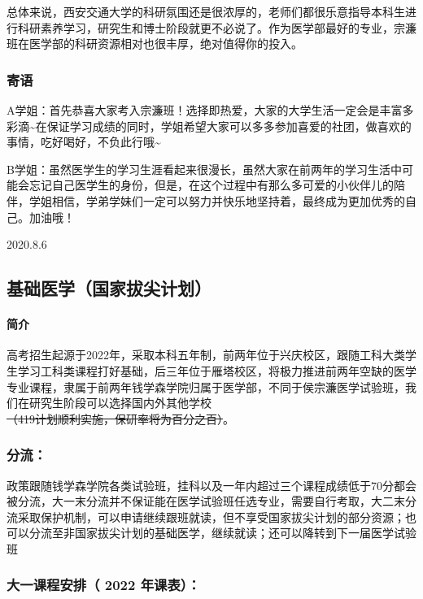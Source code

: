 \documentclass[
decoration,  %
]{qyxf-book}
\begin{document}
总体来说，西安交通大学的科研氛围还是很浓厚的，老师们都很乐意指导本科生进行科研素养学习，研究生和博士阶段就更不必说了。作为医学部最好的专业，宗濂班在医学部的科研资源相对也很丰厚，绝对值得你的投入。

\hypertarget{ux5bc4ux8bed-1}{%
	\subsubsection{寄语}\label{ux5bc4ux8bed-1}}

A学姐：首先恭喜大家考入宗濂班！选择即热爱，大家的大学生活一定会是丰富多彩滴\textasciitilde{}在保证学习成绩的同时，学姐希望大家可以多多参加喜爱的社团，做喜欢的事情，吃好喝好，不负此行哦\textasciitilde{}

B学姐：虽然医学生的学习生涯看起来很漫长，虽然大家在前两年的学习生活中可能会忘记自己医学生的身份，但是，在这个过程中有那么多可爱的小伙伴儿的陪伴，学姐相信，学弟学妹们一定可以努力并快乐地坚持着，最终成为更加优秀的自己。加油哦！

2020.8.6

\subsection{基础医学（国家拔尖计划）}

\paragraph{简介}

高考招生起源于2022年，采取本科五年制，前两年位于兴庆校区，跟随工科大类学生学习工科类课程打好基础，后三年位于雁塔校区，将极力推进前两年空缺的医学专业课程，隶属于前两年钱学森学院归属于医学部，不同于侯宗濂医学试验班，我们在研究生阶段可以选择国内外其他学校\\
\sout{（419计划顺利实施，保研率将为百分之百）}。

\subsubsection{分流：}

政策跟随钱学森学院各类试验班，挂科以及一年内超过三个课程成绩低于70分都会被分流，大一末分流并不保证能在医学试验班任选专业，需要自行考取，大二末分流采取保护机制，可以申请继续跟班就读，但不享受国家拔尖计划的部分资源；也可以分流至非国家拔尖计划的基础医学，继续就读；还可以降转到下一届医学试验班

\subsubsection{大一课程安排（ 2022 年课表）： }
\end{document}

